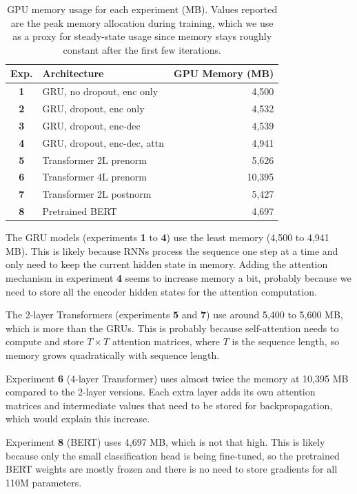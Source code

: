 \documentclass{article}
\begin{document}
\begin{table}[H]
  \centering
  \caption{GPU memory usage for each experiment (MB). Values reported are the peak memory allocation during training, which we use as a proxy for steady-state usage since memory stays roughly constant after the first few iterations.}
  \label{tab:gpu_memory}
  \begin{tabular}{clr}
    \toprule
    \textbf{Exp.} & Architecture & GPU Memory (MB) \\
    \midrule
    \textbf{1} & GRU, no dropout, enc only       & 4,500 \\
    \textbf{2} & GRU, dropout, enc only           & 4,532 \\
    \textbf{3} & GRU, dropout, enc-dec            & 4,539 \\
    \textbf{4} & GRU, dropout, enc-dec, attn      & 4,941 \\
    \textbf{5} & Transformer 2L prenorm           & 5,626 \\
    \textbf{6} & Transformer 4L prenorm           & 10,395 \\
    \textbf{7} & Transformer 2L postnorm          & 5,427 \\
    \textbf{8} & Pretrained BERT                  & 4,697 \\
    \bottomrule
  \end{tabular}
\end{table}

The GRU models (experiments \textbf{1} to \textbf{4}) use the least memory (4,500 to 4,941 MB). This is likely because RNNs process the sequence one step at a time and only need to keep the current hidden state in memory. Adding the attention mechanism in experiment \textbf{4} seems to increase memory a bit, probably because we need to store all the encoder hidden states for the attention computation.

The 2-layer Transformers (experiments \textbf{5} and \textbf{7}) use around 5,400 to 5,600 MB, which is more than the GRUs. This is probably because self-attention needs to compute and store $T \times T$ attention matrices, where $T$ is the sequence length, so memory grows quadratically with sequence length.

Experiment \textbf{6} (4-layer Transformer) uses almost twice the memory at 10,395 MB compared to the 2-layer versions. Each extra layer adds its own attention matrices and intermediate values that need to be stored for backpropagation, which would explain this increase.

Experiment \textbf{8} (BERT) uses 4,697 MB, which is not that high. This is likely because only the small classification head is being fine-tuned, so the pretrained BERT weights are mostly frozen and there is no need to store gradients for all 110M parameters.
\end{document}

